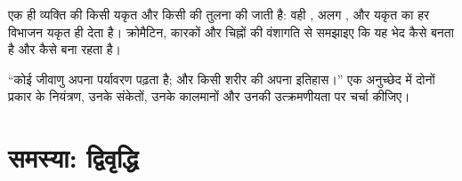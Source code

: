 \begin{exercise}[$\star\star\star$]\label{exo:b1:expression-control:11}
एक ही व्यक्ति की किसी यकृत  और किसी  की तुलना की जाती है:
वही , अलग , और यकृत  का हर विभाजन यकृत  ही
देता है। क्रोमैटिन, कारकों और चिह्नों की वंशागति से समझाइए कि यह भेद कैसे
बनता है और कैसे बना रहता है।
\end{exercise}

\begin{exercise}[$\star\star\star$]\label{exo:b1:expression-control:12}
``कोई जीवाणु अपना पर्यावरण पढ़ता है; और किसी शरीर की  अपना
इतिहास।'' एक अनुच्छेद में दोनों प्रकार के नियंत्रण, उनके संकेतों, उनके
कालमानों और उनकी उत्क्रमणीयता पर चर्चा कीजिए।
\end{exercise}

\section{समस्या: द्विवृद्धि}

